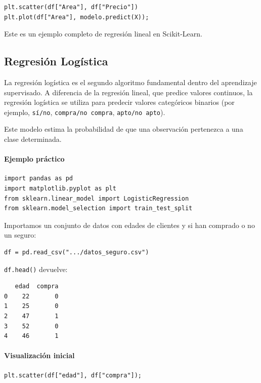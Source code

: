 \documentclass{article}
\theoremstyle{nonumberplain}
\begin{document}
\begin{verbatim}
plt.scatter(df["Area"], df["Precio"])
plt.plot(df["Area"], modelo.predict(X));
\end{verbatim}

Este es un ejemplo completo de regresión lineal en Scikit-Learn.



\subsection*{Regresión Logística}

La regresión logística es el segundo algoritmo fundamental dentro del aprendizaje supervisado. A diferencia de la regresión lineal, que predice valores continuos, la regresión logística se utiliza para predecir valores categóricos binarios (por ejemplo, \texttt{sí/no}, \texttt{compra/no compra}, \texttt{apto/no apto}).

Este modelo estima la probabilidad de que una observación pertenezca a una clase determinada.

\paragraph{Ejemplo práctico}

\begin{verbatim}
import pandas as pd
import matplotlib.pyplot as plt
from sklearn.linear_model import LogisticRegression
from sklearn.model_selection import train_test_split
\end{verbatim}

Importamos un conjunto de datos con edades de clientes y si han comprado o no un seguro:

\begin{verbatim}
df = pd.read_csv(".../datos_seguro.csv")
\end{verbatim}

\texttt{df.head()} devuelve:

\begin{verbatim}
   edad  compra
0    22       0
1    25       0
2    47       1
3    52       0
4    46       1
\end{verbatim}

\paragraph{Visualización inicial}

\begin{verbatim}
plt.scatter(df["edad"], df["compra"]);
\end{verbatim}
\end{document}

